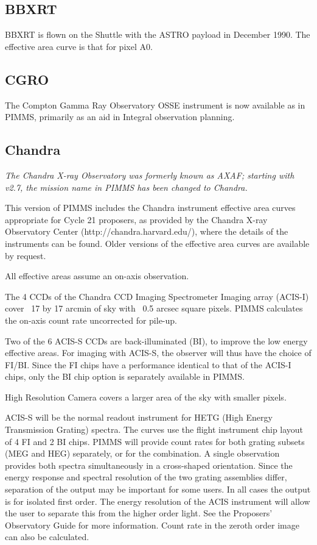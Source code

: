 \documentclass[11pt]{article}
\begin{document}
\subsection{BBXRT}

BBXRT is flown on the Shuttle with the ASTRO payload in December 1990.   The
effective area curve  is that for pixel A0.

\subsection{CGRO}

The Compton Gamma Ray Observatory OSSE instrument is now available as
in PIMMS, primarily as an aid in Integral observation planning.

\subsection{Chandra}

{\it The Chandra X-ray Observatory was formerly known as AXAF; starting
with v2.7, the mission name in PIMMS has been changed to Chandra.}

This version of PIMMS includes the Chandra instrument effective area curves
appropriate for Cycle 21 proposers, as provided by the Chandra X-ray
Observatory Center (http://chandra.harvard.edu/), where the details of the
instruments can be found.  Older versions of the effective area curves are
available by request.

All effective areas assume an on-axis observation.

The 4 CCDs of the Chandra CCD Imaging Spectrometer Imaging array (ACIS-I)
cover ~17 by 17 arcmin of sky with ~0.5 arcsec square pixels.  PIMMS
calculates the on-axis count rate uncorrected for pile-up.

Two of the 6 ACIS-S CCDs are back-illuminated (BI), to improve the low
energy effective areas. For imaging with ACIS-S, the observer will thus
have the choice of FI/BI.  Since the FI chips have a performance identical
to that of the ACIS-I chips, only the BI chip option is separately available
in PIMMS.

High Resolution Camera covers a larger area of the sky with smaller pixels.

ACIS-S will be the normal readout instrument for HETG
(High Energy Transmission Grating) spectra. The curves
use the flight instrument chip layout of 4 FI and 2 BI chips. PIMMS will
provide count rates for both grating subsets (MEG and HEG) separately, or
for the combination. A single observation provides both spectra
simultaneously in a cross-shaped orientation. Since the energy response and
spectral resolution of the two grating assemblies differ, separation of the
output may be important for some users. In all cases the output is for
isolated first order. The energy resolution of the ACIS instrument will
allow the user to separate this from the higher order light. See the Proposers'
Observatory Guide for more information.  Count rate in the zeroth order
image can also be calculated.
\end{document}
